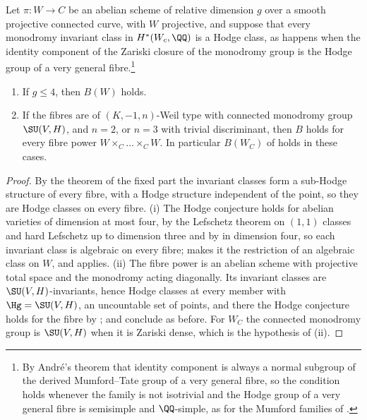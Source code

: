 \begin{corollary}
\label{cor:lefschetzsmall}
Let $\pi\colon W\to C$ be an abelian scheme of relative dimension $g$ over a
smooth projective connected curve, with $W$ projective, and suppose that
every monodromy invariant class in $H^{*}(W_{c},\QQ)$ is a Hodge class, as
happens when the identity component of the Zariski closure of the monodromy
group is the Hodge group of a very general fibre.\footnote{By Andr\'e's
theorem \cite[Theorem~1]{And92} that identity component is always a normal
subgroup of the derived Mumford--Tate group of a very general fibre, so the
condition holds whenever the family is not isotrivial and the Hodge group of
a very general fibre is semisimple and $\QQ$-simple, as for the Mumford
families of .}
\begin{enumerate}[label=\textup{(\roman*)},leftmargin=2.6em,itemsep=2pt]
\item If $g\le4$, then $B(W)$ holds.
\item If the fibres are of $(K,-1,n)$-Weil type with connected monodromy
  group $\SU(V,H)$, and $n=2$, or $n=3$ with trivial discriminant, then
  $B$ holds for every fibre power $W\times_{C}\dots\times_{C}W$. In
  particular $B(W_{C})$ of  holds in these cases.
\end{enumerate}
\end{corollary}

\begin{proof}
By the theorem of the fixed part the invariant classes form a sub-Hodge
structure of every fibre, with a Hodge structure independent of the point, so
they are Hodge classes on every fibre. (i) The Hodge conjecture holds for
abelian varieties of dimension at most four, by the Lefschetz theorem on
$(1,1)$ classes and hard Lefschetz up to dimension three and by \cite{Mar25a}
in dimension four, so each invariant
class is algebraic on every fibre;  makes it the
restriction of an algebraic class on $W$, and 
applies. (ii) The fibre power is an abelian scheme with projective total
space and the monodromy acting diagonally. Its invariant classes are
$\SU(V,H)$-invariants, hence Hodge classes at every member with
$\Hg=\SU(V,H)$, an uncountable set of points, and there the Hodge conjecture
holds for the fibre by ;  and
 conclude as before. For $W_{C}$ the connected
monodromy group is $\SU(V,H)$ when it is Zariski dense, which is the
hypothesis of (ii).
\end{proof}

